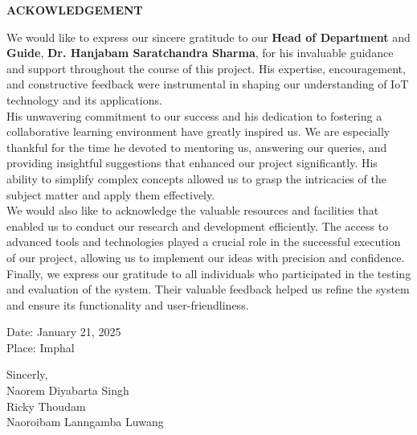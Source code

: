 \vspace*{0.6cm}
\begin{center}
    \fontsize{16}{19}\selectfont
    \textbf{ACKOWLEDGEMENT}\\[0.5cm]
\end{center}

\vspace{1cm}
{
\fontsize{12}{14}\selectfont
\noindent
We would like to express our sincere gratitude to our \textbf{Head of Department} and \textbf{Guide}, \textbf{Dr. Hanjabam Saratchandra Sharma}, for his invaluable guidance and support throughout the course of this project. His expertise, encouragement, and constructive feedback were instrumental in shaping our understanding of IoT technology and its applications. \\

\noindent
His unwavering commitment to our success and his dedication to fostering a collaborative learning environment have greatly inspired us. We are especially thankful for the time he devoted to mentoring us, answering our queries, and providing insightful suggestions that enhanced our project significantly. His ability to simplify complex concepts allowed us to grasp the intricacies of the subject matter and apply them effectively. \\

\noindent
We would also like to acknowledge the valuable resources and facilities that enabled us to conduct our research and development efficiently. The access to advanced tools and technologies played a crucial role in the successful execution of our project, allowing us to implement our ideas with precision and confidence. \\

\noindent
Finally, we express our gratitude to all individuals who participated in the testing and evaluation of the system. Their valuable feedback helped us refine the system and ensure its functionality and user-friendliness. 

\vspace{2cm}
\noindent
\begin{minipage}[t]{0.45\textwidth} %
    \begin{flushleft}
        Date: January 21, 2025\\
        Place: Imphal
    \end{flushleft}
\end{minipage}%
\hfill %
\begin{minipage}[t]{0.55\textwidth} %
    \begin{flushright}
            Sincerly,\\
            Naorem Diyabarta Singh\\
            Ricky Thoudam\\
            Naoroibam Lanngamba Luwang\\
    \end{flushright}
\end{minipage}
} 